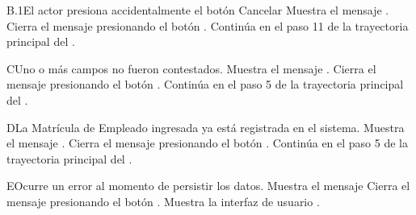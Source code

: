 
\begin{UCtrayectoriaA}{B.1}{El actor presiona accidentalmente el botón Cancelar}
    \UCpaso Muestra el mensaje .
    \UCpaso[\UCactor] Cierra el mensaje presionando el botón .
    \UCpaso Continúa en el paso 11 de la trayectoria principal del .
\end{UCtrayectoriaA}


\begin{UCtrayectoriaA}{C}{Uno o más campos no fueron contestados.}
    \UCpaso Muestra el mensaje .
    \UCpaso[\UCactor] Cierra el mensaje presionando el botón .
    \UCpaso Continúa en el paso 5 de la trayectoria principal del .
\end{UCtrayectoriaA}


\begin{UCtrayectoriaA}{D}{La Matrícula de Empleado ingresada ya está registrada en el sistema.}
    \UCpaso Muestra el mensaje .
    \UCpaso[\UCactor] Cierra el mensaje presionando el botón .
    \UCpaso Continúa en el paso 5 de la trayectoria principal del .
\end{UCtrayectoriaA}


\begin{UCtrayectoriaA}{E}{Ocurre un error al momento de persistir los datos.}
    \UCpaso Muestra el mensaje 
    \UCpaso[\UCactor] Cierra el mensaje presionando el botón .
    \UCpaso Muestra la interfaz de usuario .
\end{UCtrayectoriaA}